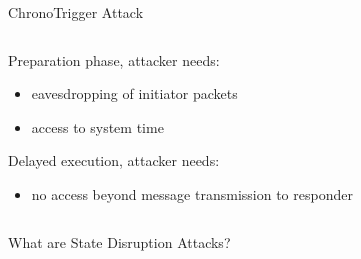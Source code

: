 \begin{frame}[T]{ChronoTrigger Attack}
\begin{columns}[fullwidth,T]
\begin{column}{.46\linewidth}
{{      \begin{block}{Preparation phase, attacker needs:}
      \begin{itemize}
        \item eavesdropping of initiator packets
        \item access to system time
      \end{itemize}
      \unskip
      \end{block}

      \begin{block}{Delayed execution, attacker needs:}
      \begin{itemize}
        \item no access beyond message transmission to responder
      \end{itemize}
      \unskip
      \end{block}
  }
}
  \end{column}
\end{columns}
\end{frame}

\begin{frame}{What are State Disruption Attacks?}
      \begin{columns}
        \begin{column}{.3\linewidth}
        \end{column}
        \hfill
        \begin{column}{.38\linewidth}
     \leavevmode{}%
	\setlength{\fboxsep}{2ex}%
        \end{column}
        \hfill
        \begin{column}{.3\linewidth}
        \end{column}
      \end{columns}
\end{frame}


